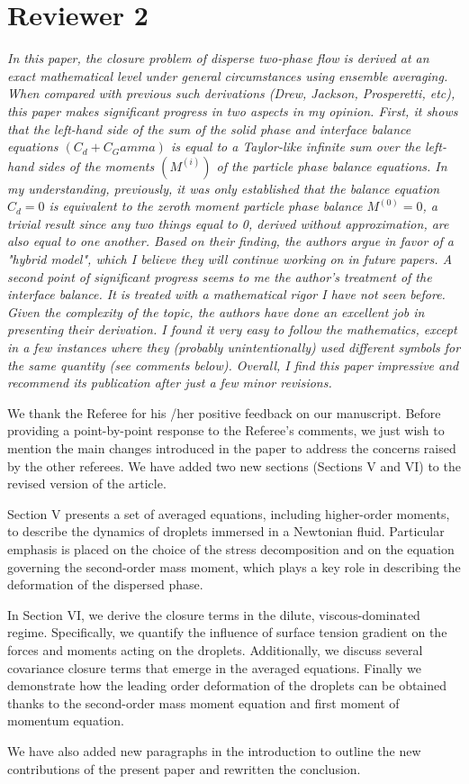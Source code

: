 \documentclass[10pt,a4paper]{article}
\newcommand{\tb}[1]{\color{blue}#1\color{black}}
\begin{document}
\section*{Reviewer 2}

\textit{In this paper, the closure problem of disperse two-phase flow is derived at an exact mathematical level under general circumstances using ensemble averaging. When compared with previous such derivations (Drew, Jackson, Prosperetti, etc), this paper makes significant progress in two aspects in my opinion. First, it shows that the left-hand side of the sum of the solid phase and interface balance equations $(C_d+C_Gamma)$ is equal to a Taylor-like infinite sum over the left-hand sides of the moments $(M^(i))$ of the particle phase balance equations. In my understanding, previously, it was only established that the balance equation $C_d =0$ is equivalent to the zeroth moment particle phase balance $M^(0)=0$, a trivial result since any two things equal to 0, derived without approximation, are also equal to one another. Based on their finding, the authors argue in favor of a "hybrid model", which I believe they will continue working on in future papers. A second point of significant progress seems to me the author's treatment of the interface balance. It is treated with a mathematical rigor I have not seen before.
Given the complexity of the topic, the authors have done an excellent job in presenting their derivation. I found it very easy to follow the mathematics, except in a few instances where they (probably unintentionally) used different symbols for the same quantity (see comments below). Overall, I find this paper impressive and recommend its publication after just a few minor revisions.}

\tb{
We thank the Referee for his /her positive feedback on our manuscript. 
Before providing a point-by-point response to the Referee’s comments, we just wish to mention the main changes introduced in the paper to address the concerns raised by the other referees.
We have added two new sections (Sections V and VI) to the revised version of the article.

Section V presents a set of averaged equations, including higher-order moments, to describe the dynamics of droplets immersed in a Newtonian fluid. 
Particular emphasis is placed on the choice of the stress decomposition and on the equation governing the second-order mass moment, which plays a key role in describing the deformation of the dispersed phase.

In Section VI, we derive the closure terms in the dilute, viscous-dominated regime. 
Specifically, we quantify the influence of surface tension gradient on the forces and moments acting on the droplets. 
Additionally, we discuss several covariance closure terms that emerge in the averaged equations.
Finally we demonstrate how the leading order deformation of the droplets can be obtained thanks to the second-order mass moment equation and first moment of momentum equation.

We have also added new paragraphs in the introduction to outline the new contributions of the present paper and rewritten the conclusion.

}
\end{document}
